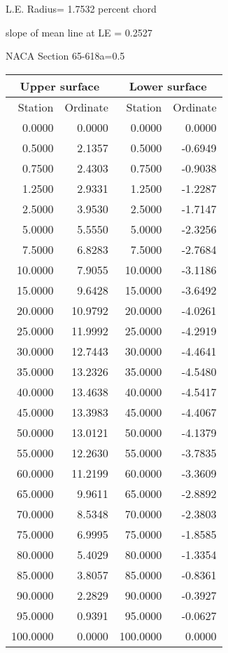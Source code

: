 \documentclass[11pt]{book}
\begin{document}
L.E. Radius=  1.7532 percent chord


 slope of mean line at LE =  0.2527
 \newpage
  \label{s65-618a=0.5}
 \begin{Large}
 NACA Section 65-618a=0.5
 \end{Large}
  
 \vspace{8mm}
 \begin{tabular}{|r|r|r|r|} \hline 
 \multicolumn{2}{|c|}{Upper surface} & \multicolumn{2}{|c|}{Lower surface} \\
 \hline
 Station & Ordinate & Station & Ordinate \\
 \hline
0.0000 & 0.0000 & 0.0000 & 0.0000 \\
0.5000 & 2.1357 & 0.5000 & -0.6949 \\
0.7500 & 2.4303 & 0.7500 & -0.9038 \\
1.2500 & 2.9331 & 1.2500 & -1.2287 \\
2.5000 & 3.9530 & 2.5000 & -1.7147 \\
5.0000 & 5.5550 & 5.0000 & -2.3256 \\
7.5000 & 6.8283 & 7.5000 & -2.7684 \\
10.0000 & 7.9055 & 10.0000 & -3.1186 \\
15.0000 & 9.6428 & 15.0000 & -3.6492 \\
20.0000 & 10.9792 & 20.0000 & -4.0261 \\
25.0000 & 11.9992 & 25.0000 & -4.2919 \\
30.0000 & 12.7443 & 30.0000 & -4.4641 \\
35.0000 & 13.2326 & 35.0000 & -4.5480 \\
40.0000 & 13.4638 & 40.0000 & -4.5417 \\
45.0000 & 13.3983 & 45.0000 & -4.4067 \\
50.0000 & 13.0121 & 50.0000 & -4.1379 \\
55.0000 & 12.2630 & 55.0000 & -3.7835 \\
60.0000 & 11.2199 & 60.0000 & -3.3609 \\
65.0000 & 9.9611 & 65.0000 & -2.8892 \\
70.0000 & 8.5348 & 70.0000 & -2.3803 \\
75.0000 & 6.9995 & 75.0000 & -1.8585 \\
80.0000 & 5.4029 & 80.0000 & -1.3354 \\
85.0000 & 3.8057 & 85.0000 & -0.8361 \\
90.0000 & 2.2829 & 90.0000 & -0.3927 \\
95.0000 & 0.9391 & 95.0000 & -0.0627 \\
100.0000 & 0.0000 & 100.0000 & 0.0000 \\
 \hline 
 \end{tabular}
\end{document}
